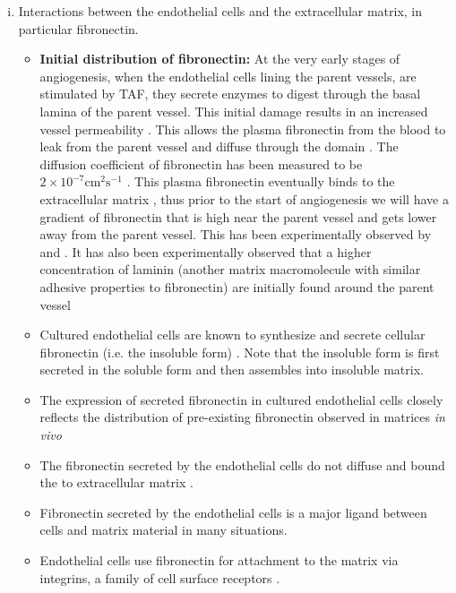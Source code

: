 \begin{enumerate}[(i),noitemsep]
	\item Interactions between the endothelial cells and the extracellular matrix, in particular fibronectin.
	\begin{itemize}
		\item \label{item:initialPhaseOfFibroNectin} \textbf{Initial distribution of fibronectin:} At the very early stages of angiogenesis, when the endothelial cells lining the parent vessels, are stimulated by TAF, they secrete enzymes to digest through the basal lamina of the parent vessel. This initial damage results in an increased vessel permeability \cite{Clark1981-pb}. This allows the plasma fibronectin from the blood to leak from the parent vessel and diffuse through the domain \cite{Hynes1989-je}. The diffusion coefficient of fibronectin has been measured to be $ 2\times10^{-7} \text{cm}^2\text{s}^{-1} $ \cite{Williams1982,Rocco1987}. This plasma fibronectin eventually binds to the extracellular matrix \cite{Oh1981,Deno1983,Clark1983}, thus prior to the start of angiogenesis we will have a gradient of fibronectin that is high near the parent vessel and gets lower away from the parent vessel. This has been experimentally observed by \cite{Paku1991} and \cite{Clark1982,Clark1981-pb,Clark1983}. It has also been experimentally observed that a higher concentration of laminin (another matrix macromolecule with similar adhesive properties to fibronectin) are initially found around the parent vessel \cite{Hynes1989-je,Paku1991}
		\item Cultured endothelial cells are known to synthesize and secrete cellular fibronectin (i.e. the insoluble form) \cite{Birdwell1978,Birdwell1980,1978,Macarak1978,Nerlich1991}. Note that the insoluble form is first secreted in the soluble form and then assembles into insoluble matrix.
		\item The expression of secreted fibronectin in cultured endothelial cells closely reflects the distribution of pre-existing fibronectin  observed in matrices \emph{in vivo} \cite{Vlodavsky1979,Hynes1989-je}
		\item The fibronectin secreted by the endothelial cells do not diffuse and bound the to extracellular matrix \cite{Birdwell1980,Hynes1989-je}.
		\item Fibronectin secreted by the endothelial cells is a major ligand between cells and matrix material in many situations.
		\item Endothelial cells use fibronectin for attachment to the matrix via integrins, a family of cell surface receptors \cite{Johansson1987,Hynes1989-je,Alberts2002a}.

\end{itemize}
\end{enumerate}
